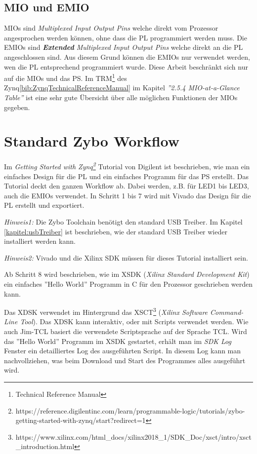 \subsection{MIO und EMIO}
MIOs sind \textit{Multiplexed Input Output Pins} welche direkt vom Prozessor angesprochen werden können, ohne dass die PL programmiert werden muss.
Die EMIOs sind \textit{\textbf{Extended} Multiplexed Input Output Pins} welche direkt an die PL angeschlossen sind.
Aus diesem Grund können die EMIOs nur verwendet werden, wen die PL entsprechend programmiert wurde.
Diese Arbeit beschränkt sich nur auf die MIOs und das PS.
Im TRM\footnote{Technical Reference Manual} des Zynq\ref{bib:ZynqTechnicalReferenceManual} im Kapitel \textit{''2.5.4 MIO-at-a-Glance Table''} ist eine sehr gute Übersicht über alle möglichen Funktionen der MIOs gegeben.



\section{Standard Zybo Workflow}
Im \textit{Getting Started with Zynq\footnote{https://reference.digilentinc.com/learn/programmable-logic/tutorials/zybo-getting-started-with-zynq/start?redirect=1}} Tutorial von Digilent ist beschrieben, wie man ein einfaches Design für die PL und ein einfaches Programm für das PS erstellt.
Das Tutorial deckt den ganzen Workflow ab.
Dabei werden, z.B. für LED1 bis LED3, auch die EMIOs verwendet.
In Schritt 1 bis 7 wird mit Vivado das Design für die PL erstellt und exportiert.

\textit{Hinweis1:} Die Zybo Toolchain benötigt den standard USB Treiber. Im Kapitel \ref{kapitel:usbTreiber} ist beschrieben, wie der standard USB Treiber wieder installiert werden kann.

\textit{Hinweis2:} Vivado und die Xilinx SDK müssen für dieses Tutorial installiert sein.

Ab Schritt 8 wird beschrieben, wie im XSDK (\textit{Xilinx Standard Development Kit}) ein einfaches ''Hello World'' Programm in C für den Prozessor geschrieben werden kann.

Das XDSK verwendet im Hintergrund das XSCT\footnote{https://www.xilinx.com/html\_docs/xilinx2018\_1/SDK\_Doc/xsct/intro/xsct\_introduction.html} (\textit{Xilinx Software Command-Line Tool}).
Das XDSK kann interaktiv, oder mit Scripts verwendet werden.
Wie auch Jim-TCL basiert die verwendete Scriptsprache auf der Sprache TCL.
Wird das ''Hello World'' Programm im XSDK gestartet, erhält man im \textit{SDK Log} Fenster ein detailliertes Log des ausgeführten Script.
In diesem Log kann man nachvollziehen, was beim Download und Start des Programmes alles ausgeführt wird.
